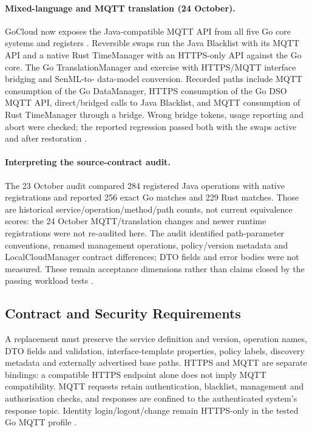 \documentclass[a4paper]{arrowhead}
\newcommand{\sys}[1]{\textcolor{ArrowheadBlue}{\textbf{\ahbreak{#1}}}}      %
\begin{document}
\paragraph{Mixed-language and MQTT translation (24 October).}
GoCloud now exposes the Java-compatible MQTT API from all five Go core systems
and registers . Reversible swaps run the Java Blacklist with
its MQTT API and a native Rust TimeManager with an HTTPS-only API against the
Go core. The Go TranslationManager and \sys{TestTranslation} exercise
 with HTTPS/MQTT interface bridging and
SenML-to- data-model conversion. Recorded paths include MQTT
consumption of the Go DataManager, HTTPS consumption of the Go DSO MQTT API,
direct/bridged calls to Java Blacklist, and MQTT consumption of Rust TimeManager
through a bridge. Wrong bridge tokens, usage reporting and abort were checked;
the reported regression passed both with the swaps active and after restoration
\cite{goMqtt20261024}.

\paragraph{Interpreting the source-contract audit.}
The 23 October audit compared 284 registered Java operations with native
registrations and reported 256 exact Go matches and 229 Rust matches. Those are
historical service/operation/method/path counts, not current equivalence scores:
the 24 October MQTT/translation changes and newer runtime registrations were not
re-audited here. The audit identified path-parameter conventions, renamed management
operations, policy/version metadata and LocalCloudManager contract differences;
DTO fields and error bodies were not measured. These remain acceptance dimensions
rather than claims closed by the passing workload tests
\cite{contractAudit20261023}.

\subsection{Contract and Security Requirements}
A replacement must preserve the service definition and version, operation names,
DTO fields and validation, interface-template properties, policy labels, discovery
metadata and externally advertised base paths. HTTPS and MQTT are separate
bindings: a compatible HTTPS endpoint alone does not imply MQTT compatibility.
MQTT requests retain authentication, blacklist, management and authorisation
checks, and responses are confined to the authenticated system's response topic.
Identity login/logout/change remain HTTPS-only in the tested Go MQTT profile
\cite{goMqtt20261024}.
\end{document}
